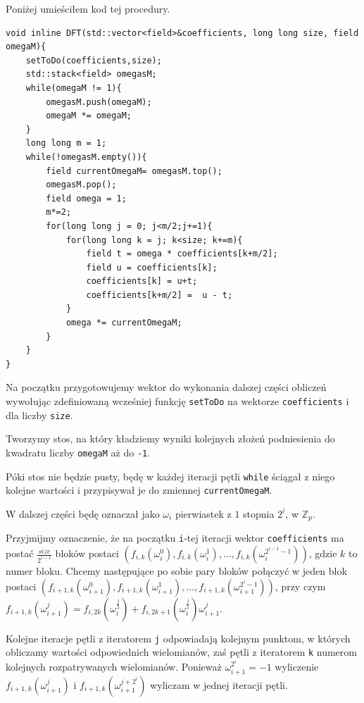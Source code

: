 \documentclass{article}
\begin{document}
Poniżej umieściłem kod tej procedury.

\begin{lstlisting}
void inline DFT(std::vector<field>&coefficients, long long size, field omegaM){
    setToDo(coefficients,size);
    std::stack<field> omegasM;
    while(omegaM != 1){
        omegasM.push(omegaM);
        omegaM *= omegaM;
    }
    long long m = 1;
    while(!omegasM.empty()){   
        field currentOmegaM= omegasM.top();
        omegasM.pop();
        field omega = 1;
        m*=2;
        for(long long j = 0; j<m/2;j+=1){
            for(long long k = j; k<size; k+=m){
                field t = omega * coefficients[k+m/2];
                field u = coefficients[k];
                coefficients[k] = u+t;
                coefficients[k+m/2] =  u - t;
            }
            omega *= currentOmegaM;
        }
    }
}
\end{lstlisting}



Na początku przygotowujemy wektor do wykonania dalszej części obliczeń wywołując zdefiniowaną wcześniej funkcję \texttt{setToDo} na wektorze 
\texttt{coefficients} i dla liczby \texttt{size}. 

Tworzymy stos, na który kładziemy wyniki kolejnych złożeń podniesienia do kwadratu liczby \texttt{omegaM} aż do \texttt{-1}.

Póki stos nie będzie pusty, będę w każdej iteracji pętli \texttt{while} ściągał z niego kolejne wartości i przypisywał je do zmiennej \texttt{currentOmegaM}.

W dalszej części będę oznaczał jako $\omega_i$ pierwiastek z $1$ stopnia $2^i$, w $\mathbb{Z}_p$.

Przyjmijmy oznaczenie, że na początku \texttt{i}-tej iteracji wektor \texttt{coefficients} ma postać $\frac{size}{2^{i-1}}$ bloków postaci
$(f_{i,k}(\omega_i^0), f_{i,k}(\omega_i^1), ...,f_{i,k}(\omega^{2^{i-1}-1}_i))$, gdzie $k$ to numer bloku. Chcemy
następujące po sobie pary bloków połączyć w jeden blok postaci $(f_{i+1,k}(\omega_{i+1}^0),f_{i+1,k}(\omega_{i+1}^1),...,
f_{i+1,k}(\omega^{2^{i}-1}_{i+1}))$, przy czym 
$f_{i+1,k}(\omega_{i+1}^j) = f_{i,2k}(\omega_{i}^\frac{j}{2})+f_{i,2k+1}(\omega_{i}^{\frac{j}{2}})\omega_{i+1}^j$. 

Kolejne iteracje pętli z iteratorem \texttt{j} odpowiadają kolejnym punktom, w których obliczamy wartości odpowiednich wielomianów, zaś pętli z iteratorem 
\texttt{k}
numerom kolejnych rozpatrywanych wielomianów. Ponieważ $\omega_{i+1}^{2^i}=-1$ wyliczenie $f_{i+1,k}(\omega_{i+1}^{j})$ i $f_{i+1,k}(\omega_{i+1}^{j+2^i})$ 
wyliczam w jednej iteracji pętli.
\end{document}
